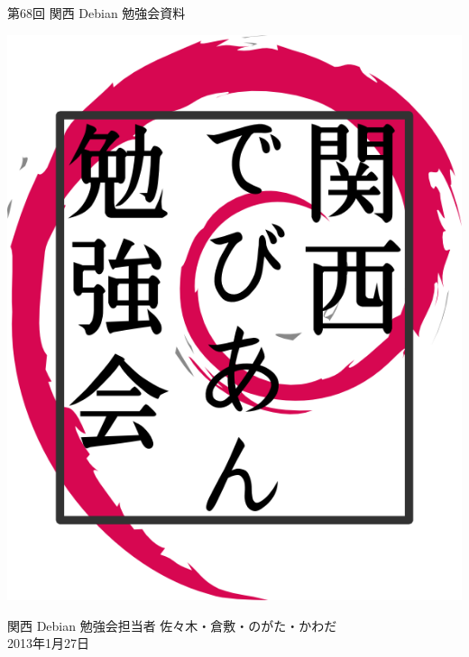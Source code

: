 \documentclass[mingoth,a4paper]{jsarticle}
\newcommand{\debmtgyear}{2013}
\newcommand{\debmtgdate}{27}
\newcommand{\debmtgmonth}{1}
\newcommand{\debmtgnumber}{68}
\begin{document}
\begin{titlepage}


 第\debmtgnumber{}回 関西 Debian 勉強会資料

\vspace{2cm}

\begin{center}
\includegraphics{image200802/kansaidebianlogo.png}
\end{center}

\begin{flushright}
\hfill{}関西 Debian 勉強会担当者 佐々木・倉敷・のがた・かわだ \\
\hfill{}\debmtgyear{}年\debmtgmonth{}月\debmtgdate{}日
\end{flushright}

\thispagestyle{empty}
\end{titlepage}


\vspace{1em}
\end{document}
